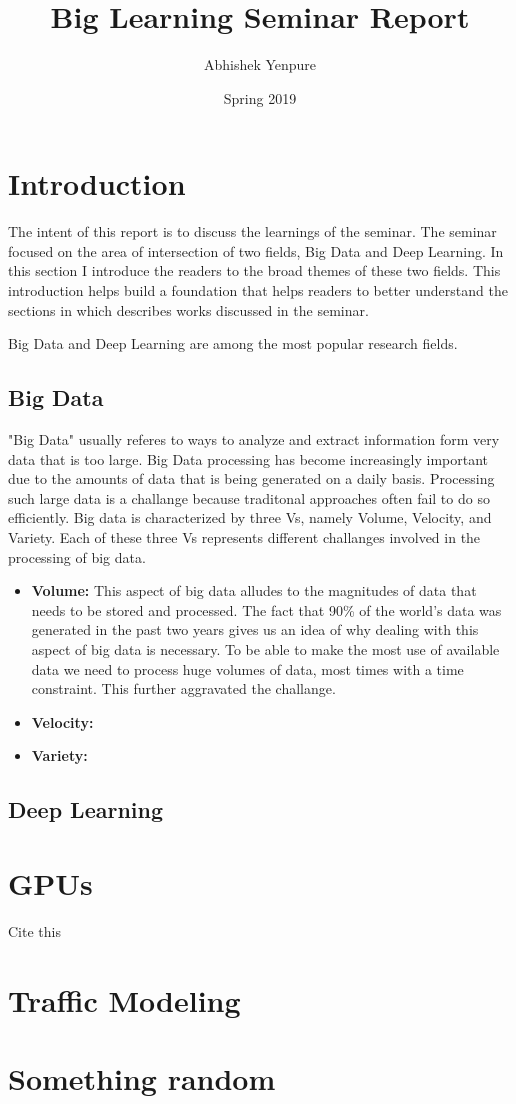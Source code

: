 \documentclass[12pt]{extarticle}
\title{Big Learning Seminar Report}
\author{Abhishek Yenpure}
\date{Spring 2019}
\begin{document}
\maketitle

\section{Introduction}
%
The intent of this report is to discuss the learnings of the seminar.
%
The seminar focused on the area of intersection of two fields, Big Data and Deep Learning.
%
In this section I introduce the readers to the broad themes of these two fields.
%
This introduction helps build a foundation that helps readers to better understand the
sections in which describes works discussed in the seminar. 

Big Data and Deep Learning are among the most popular research fields.
%

%
\subsection{Big Data}
"Big Data" usually referes to ways to analyze and extract information form very
data that is too large.
%
Big Data processing has become increasingly important due to the amounts of data
that is being generated on a daily basis.
%
Processing such large data is a challange because traditonal approaches often fail
to do so efficiently.
%
Big data is characterized by three Vs, namely Volume, Velocity, and Variety.
%
Each of these three Vs represents different challanges involved in the processing
of big data.
%
\begin{itemize}
\item \textbf{Volume:}
%
This aspect of big data alludes to the magnitudes of data that needs to be stored
and processed.
%
The fact that 90\% of the world's data was generated in the past two years gives
us an idea of why dealing with this aspect of big data is necessary.
%
To be able to make the most use of available data we need to process huge volumes
of data, most times with a time constraint.
%
This further aggravated the challange.

\item \textbf{Velocity:}

\item \textbf{Variety:}

\end{itemize}
%
\subsection{Deep Learning}
 

\section{GPUs}
Cite this~\cite{chen2014big}

\section{Traffic Modeling}

\section{Something random}



\end{document}
